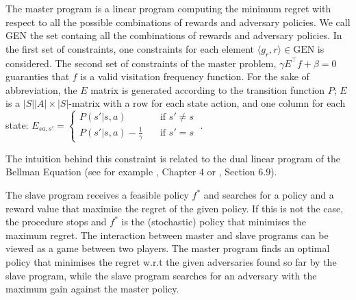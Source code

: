 \documentclass[sigconf]{aamas}  %
\begin{document}
The master program is a linear program computing the minimum regret with respect to all the possible combinations of rewards and adversary policies. We call GEN the set containg all the combinations of rewards and adversary policies. 
In the first set of constraints, one constraints for each element $\langle g_r, r \rangle \in \text{GEN}$ is considered. 
The second set of constraints of the master problem, $\gamma E ^{\top}f+ \beta = 0$ guaranties that $f$ is a valid visitation frequency function. For the sake of abbreviation, the $E$ matrix is generated according to the transition function $P$; $E$ is a $|S||A| \times |S|$-matrix with a row for each state action, and one column for each state: $E_{sa,s'} = 
     \begin{cases}
       P(s'|s, a) &\quad \text{if } s' \neq s\\
       P(s'|s, a) - \frac{1}{\gamma} &\quad \text{if } s' = s
     \end{cases}\;.$
     
The intuition behind this constraint is related to the dual linear program of the Bellman Equation (see for example \cite{Sutton1998}, Chapter $4$ or \citep{Puterman1994}, Section $6.9$). 


The slave program receives a feasible policy $f^*$ and 
searches for a policy and a reward value that maximise the regret of the given policy.
If this is not the case, the procedure stops and $f^*$ is the (stochastic) policy that minimises the maximum regret. 
The interaction between master and slave programs  can be viewed as a game between two players. The master program  finds an optimal policy that minimises the regret  w.r.t the given adversaries found so far by the slave program, while the slave program searches for an adversary with the maximum gain against the master policy. 
\end{document}
